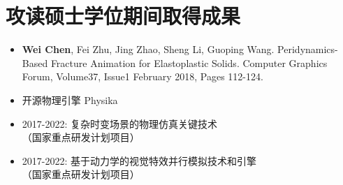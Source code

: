 ﻿\chapter{攻读硕士学位期间取得成果}

\begin{itemize}
  \item \textbf{Wei Chen}, Fei Zhu, Jing Zhao, Sheng Li, Guoping Wang. Peridynamics-Based Fracture Animation for Elastoplastic Solids. Computer Graphics Forum, Volume37, Issue1 February 2018, Pages 112-124.
\end{itemize}

\vspace*{5cm}

\begin{itemize}
  \item 开源物理引擎 Physika
  \item 2017-2022: 复杂时变场景的物理仿真关键技术\\
  （国家重点研发计划项目）
  \item 2017-2022: 基于动力学的视觉特效并行模拟技术和引擎\\
  （国家重点研发计划项目）
\end{itemize}
